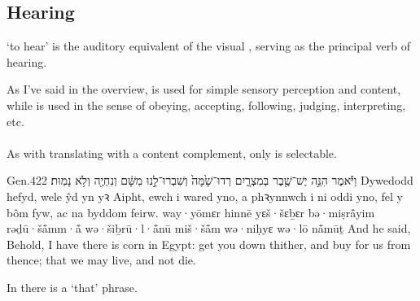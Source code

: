 \subsection{Hearing}


\begin{paper}
	{\click}  ‘to hear’ is the auditory equivalent of the visual , serving as the principal verb of hearing.

	As I’ve said in the overview,  is used for simple sensory perception and content, while  is used in the sense of obeying, accepting, following, judging, interpreting, etc.
\end{paper}



\paragraph{}


\begin{paper}
	As with  translating  with a content complement, only  is selectable.
\end{paper}

\begin{example}{Gen.}{42}{2}{}{}
	\quoling
	{וַיֹּ֕אמֶר הִנֵּ֣ה   יֶשׁ־שֶׁ֖בֶר בְּמִצְרָ֑יִם רְדוּ־שָׁ֙מָּה֙ וְשִׁבְרוּ־לָ֣נוּ מִשָּׁ֔ם וְנִחְיֶ֖ה וְלֹ֥א נָמֽוּת׃}
	{Dywedodd hefyd, wele   ŷd yn yꝛ Aipht, ewch i wared yno, a phꝛynnwch i ni oddi yno, fel y bôm fyw, ac na byddom feirw.}
	{way·yōmɛr hinnē   yɛš·šɛḇɛr bə·miṣrå̄yim rəḏū·šå̄mm·å̄ wə·šiḇrū·l·å̄nū miš·šå̄m wə·niḥyɛ wə·lō nå̄mūṯ}
	{And he said, Behold, I have   there is corn in Egypt: get you down thither, and buy for us from thence; that we may live, and not die.}
\end{example}
\begin{paper}
	\explain In  there is a  ‘that’ phrase.
\end{paper}

